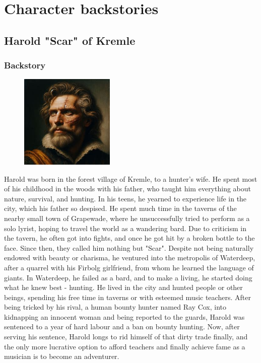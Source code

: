 \documentclass[10pt,twocolumn,twoside,openany,bg=full,layout=true,nomultitoc]{dndbook}
\begin{document}
\pagebreak


\chapter{Character backstories}\label{ch:character-backstories}
\section{Harold "Scar" of Kremle}\label{sec:harold-"scar"-of-kremle}
\subsection{Backstory}\label{subsec:harold-backstory}
\begin{figure}
  \begin{center}
    \includegraphics[width=0.4\textwidth]{img/harold}
    \vspace{1cm}
  \end{center}
\end{figure}
Harold was born in the forest village of Kremle, to a hunter's wife.
He spent most of his childhood in the woods with his father, who taught him everything about nature, survival, and hunting.
In his teens, he yearned to experience life in the city, which his father so despised.
He spent much time in the taverns of the nearby small town of Grapewade,
where he unsuccessfully tried to perform as a solo lyrist, hoping to travel the world as a wandering bard.
Due to criticism in the tavern, he often got into fights, and once he got hit by a broken bottle to the face.
Since then, they called him nothing but "Scar".
Despite not being naturally endowed with beauty or charisma, he ventured into the metropolis of Waterdeep, after a
quarrel with his Firbolg girlfriend, from whom he learned the language of giants.
In Waterdeep, he failed as a bard, and to make a living, he started doing what he knew best - hunting.
He lived in the city and hunted people or other beings, spending his free time in taverns or with esteemed music teachers.
After being tricked by his rival, a human bounty hunter named Ray Cox, into kidnapping an innocent woman and
being reported to the guards, Harold was sentenced to a year of hard labour and a ban on bounty hunting.
Now, after serving his sentence, Harold longs to rid himself of that dirty trade finally, and the only more
lucrative option to afford teachers and finally achieve fame as a musician is to become an adventurer.
\end{document}
